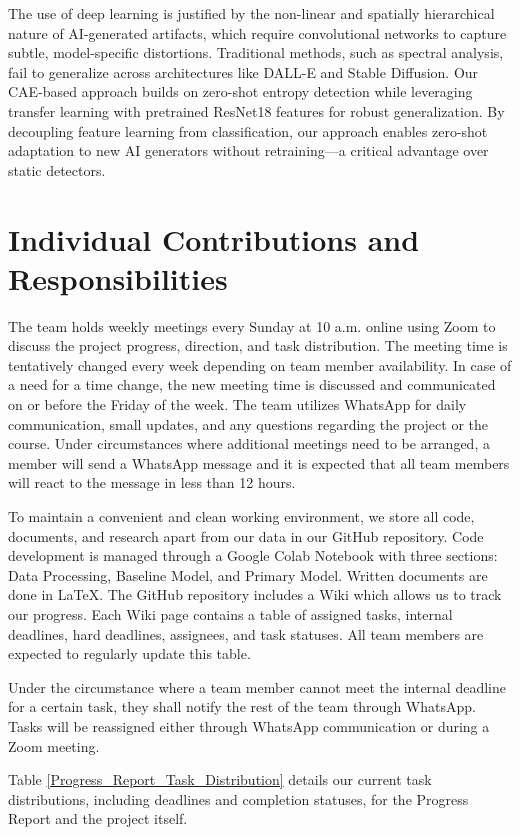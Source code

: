\documentclass{article} %
\begin{document}
The use of deep learning is justified by the non-linear and spatially hierarchical nature of AI-generated artifacts, which require convolutional networks to capture subtle, model-specific distortions. Traditional methods, such as spectral analysis, fail to generalize across architectures like DALL-E and Stable Diffusion. Our CAE-based approach builds on zero-shot entropy detection while leveraging transfer learning with pretrained ResNet18 features for robust generalization. By decoupling feature learning from classification, our approach enables zero-shot adaptation to new AI generators without retraining—a critical advantage over static detectors.

\section{Individual Contributions and Responsibilities}

The team holds weekly meetings every Sunday at 10 a.m. online using Zoom to discuss the project progress, direction, and task distribution. The meeting time is tentatively changed every week depending on team member availability. In case of a need for a time change, the new meeting time is discussed and communicated on or before the Friday of the week. The team utilizes WhatsApp for daily communication, small updates, and any questions regarding the project or the course. Under circumstances where additional meetings need to be arranged, a member will send a WhatsApp message and it is expected that all team members will react to the message in less than 12 hours.

To maintain a convenient and clean working environment, we store all code, documents, and research apart from our data in our GitHub repository. Code development is managed through a Google Colab Notebook with three sections: Data Processing, Baseline Model, and Primary Model. Written documents are done in LaTeX. The GitHub repository includes a Wiki which allows us to track our progress. Each Wiki page contains a table of assigned tasks, internal deadlines, hard deadlines, assignees, and task statuses. All team members are expected to regularly update this table.

Under the circumstance where a team member cannot meet the internal deadline for a certain task, they shall notify the rest of the team through WhatsApp. Tasks will be reassigned either through WhatsApp communication or during a Zoom meeting.

Table \ref{Progress_Report_Task_Distribution} details our current task distributions, including deadlines and completion statuses, for the Progress Report and the project itself.
\end{document}
